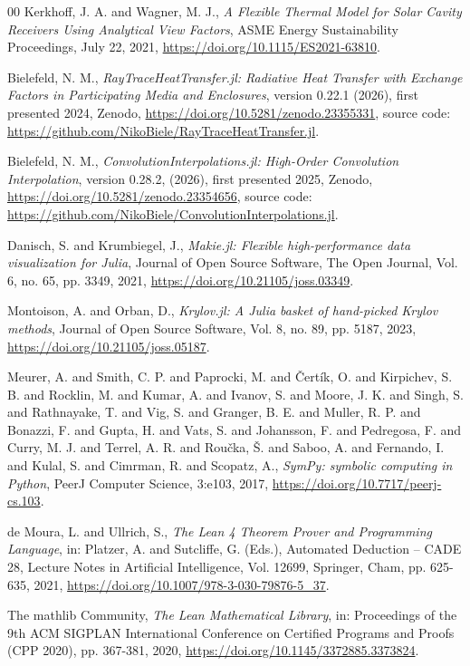 \documentclass[preprint,1p,times]{elsarticle}
\theoremstyle{plain}
\theoremstyle{definition}
\theoremstyle{remark}
\begin{document}
\begin{thebibliography}{00}
	Kerkhoff, J. A. and Wagner, M. J.,
	\textit{A Flexible Thermal Model for Solar Cavity Receivers Using Analytical View Factors},
	ASME Energy Sustainability Proceedings,
	July 22, 2021,
	\url{https://doi.org/10.1115/ES2021-63810}.
	
	Bielefeld, N. M.,
	\textit{RayTraceHeatTransfer.jl: Radiative Heat Transfer with Exchange Factors in Participating Media and Enclosures},
	version 0.22.1 (2026), first presented 2024, Zenodo,
	\url{https://doi.org/10.5281/zenodo.23355331},
	source code: \url{https://github.com/NikoBiele/RayTraceHeatTransfer.jl}.
	
	Bielefeld, N. M.,
	\textit{ConvolutionInterpolations.jl: High-Order Convolution Interpolation},
	version 0.28.2, (2026), first presented 2025, Zenodo,
	\url{https://doi.org/10.5281/zenodo.23354656},
	source code: \url{https://github.com/NikoBiele/ConvolutionInterpolations.jl}.
	
	Danisch, S. and Krumbiegel, J.,
	\textit{Makie.jl: Flexible high-performance data visualization for Julia},
	Journal of Open Source Software,
	The Open Journal,
	Vol. 6, no. 65, pp. 3349, 2021,
	\url{https://doi.org/10.21105/joss.03349}.

	Montoison, A. and Orban, D.,
	\textit{Krylov.jl: A Julia basket of hand-picked Krylov methods},
	Journal of Open Source Software,
	Vol. 8, no. 89, pp. 5187, 2023,
	\url{https://doi.org/10.21105/joss.05187}.
	
	Meurer, A. and Smith, C. P. and Paprocki, M. and \v{C}ert\'{i}k, O. and Kirpichev, S. B. and Rocklin, M. and Kumar, A. and Ivanov, S. and Moore, J. K. and Singh, S. and Rathnayake, T. and Vig, S. and Granger, B. E. and Muller, R. P. and Bonazzi, F. and Gupta, H. and Vats, S. and Johansson, F. and Pedregosa, F. and Curry, M. J. and Terrel, A. R. and Rou\v{c}ka, \v{S}. and Saboo, A. and Fernando, I. and Kulal, S. and Cimrman, R. and Scopatz, A.,
	\textit{SymPy: symbolic computing in Python},
	PeerJ Computer Science,
	3:e103,
	2017,
	\url{https://doi.org/10.7717/peerj-cs.103}.

	de Moura, L. and Ullrich, S.,
	\textit{The Lean 4 Theorem Prover and Programming Language},
	in: Platzer, A. and Sutcliffe, G. (Eds.), Automated Deduction -- CADE 28,
	Lecture Notes in Artificial Intelligence, Vol. 12699, Springer, Cham,
	pp. 625-635, 2021,
	\url{https://doi.org/10.1007/978-3-030-79876-5_37}.

	The mathlib Community,
	\textit{The Lean Mathematical Library},
	in: Proceedings of the 9th ACM SIGPLAN International Conference on Certified Programs and Proofs (CPP 2020),
	pp. 367-381, 2020,
	\url{https://doi.org/10.1145/3372885.3373824}.

\end{thebibliography}
\end{document}
